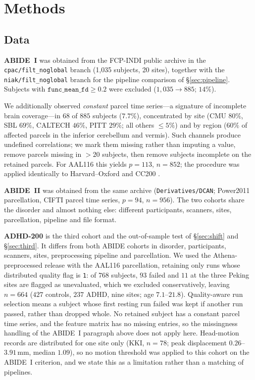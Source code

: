 \documentclass[11pt,a4paper]{article}
\begin{document}
\section{Methods}
\label{sec:methods}

\subsection{Data}
\label{sec:data}

\textbf{ABIDE~I} \citep{dimartino2014autism} was obtained from the FCP-INDI
public archive in the \texttt{cpac/filt\_noglobal} branch (1{,}035 subjects,
20 sites), together with the \texttt{niak/filt\_noglobal} branch for the
pipeline comparison of \S\ref{sec:pipeline}. Subjects with
$\texttt{func\_mean\_fd}\ge0.2$ were excluded ($1{,}035\to885$; $14\%$).

We additionally observed \emph{constant} parcel time series---a signature of
incomplete brain coverage---in $68$ of $885$ subjects ($7.7\%$),
concentrated by site (CMU $80\%$, SBL $69\%$, CALTECH $46\%$, PITT $29\%$;
all others $\le5\%$) and by region ($60\%$ of affected parcels in the
inferior cerebellum and vermis). Such channels produce undefined
correlations; we mark them missing rather than imputing a value, remove
parcels missing in $>20$ subjects, then remove subjects incomplete on the
retained parcels. For AAL116 \citep{tzourio2002automated} this yields
$p=113$, $n=852$; the procedure was applied identically to Harvard--Oxford
and CC200 \citep{craddock2012whole}.

\textbf{ABIDE~II} \citep{dimartino2017abide2} was obtained from the same
archive (\texttt{Derivatives/DCAN}; Power2011 parcellation, CIFTI parcel time
series, $p=94$, $n=956$). The two cohorts share the disorder and almost
nothing else: different participants, scanners, sites, parcellation,
pipeline and file format.

\textbf{ADHD-200} \citep{bellec2017adhd200} is the third cohort and the
out-of-sample test of \S\ref{sec:shift} and \S\ref{sec:third}. It differs
from both ABIDE cohorts in disorder, participants, scanners, sites,
preprocessing pipeline and parcellation. We used the Athena-preprocessed
release with the AAL116 parcellation, retaining only runs whose distributed
quality flag is \texttt{1}: of $768$ subjects, $93$ failed and $11$ at the
three Peking sites are flagged as unevaluated, which we excluded
conservatively, leaving $n=664$ ($427$ controls, $237$ ADHD, nine sites;
age $7.1$--$21.8$). Quality-aware run selection means a subject whose first
resting run failed was kept if another run passed, rather than dropped
whole. No retained subject has a constant parcel time series, and the
feature matrix has no missing entries, so the missingness handling of the
ABIDE~I paragraph above does not apply here. Head-motion records are
distributed for one site only (KKI, $n=78$; peak displacement
$0.26$--$3.91$\,mm, median $1.09$), so no motion threshold was applied to
this cohort on the ABIDE~I criterion, and we state this as a limitation
rather than a matching of pipelines.
\end{document}
